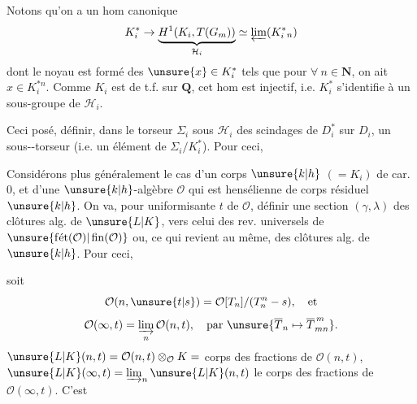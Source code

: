 
Notons qu'on a un hom canonique
\[
K_i^*\to\underbrace{H^1(K_i,T(G_m))}_{\mathcal{H}_i}
\simeq\varprojlim(K_i^*{}_n)
\]
dont le noyau est formé des $\unsure{x}\in K_i^*$ tels que pour $\forall\ n\in\mathbf{N}$, on ait $x\in K_i^{*n}$.
Comme $K_i$ est de t.f. sur $\mathbf{Q}$, cet hom est injectif, i.e. $K_i^*$ s'identifie à un sous-groupe de $\mathcal{H}_i$.

Ceci posé,  définir, dans le torseur $\Sigma_i$ sous $\mathcal{H}_i$ des scindages de $D_i^*$ sur $D_i$, un sous--torseur (i.e. un élément de $\Sigma_i/K_i^*$).
Pour ceci,




Considérons plus généralement le cas d'un corps $\unsure{k|h}$ $(=K_i)$ de car. $0$, et d'une  $\unsure{k|h}$-algèbre $\mathcal{O}$ qui est  hensélienne de corps résiduel $\unsure{k|h}$.
On va, pour  uniformisante $t$ de $\mathcal{O}$, définir une section $(\gamma,\lambda)$    des clôtures alg. de $\unsure{L|K}$, vers celui des rev. universels de $\unsure{\operatorname{f\acute{e}t}(\mathcal{O})|\operatorname{fin}(\mathcal{O})}$ ou, ce qui revient au même, des clôtures alg. de $\unsure{k|h}$. Pour ceci,

soit
\[
\mathcal{O}(n,\unsure{t|s})=\mathcal{O}[T_n]/(T_n^n-s),\quad\text{et}
\]
\[
\mathcal{O}(\infty,t)=\varinjlim_n\mathcal{O}(n,t),\quad
\text{par }\unsure{\overline{T}_n\mapsto\overline{T}_{mn}^{\,m}}.
\]
$\unsure{L|K}(n,t)=\mathcal{O}(n,t)\otimes_{\mathcal{O}}K=$ corps des fractions de $\mathcal{O}(n,t)$, $\unsure{L|K}(\infty,t)=\varinjlim_n\unsure{L|K}(n,t)$ le corps des fractions de $\mathcal{O}(\infty,t)$. C'est

